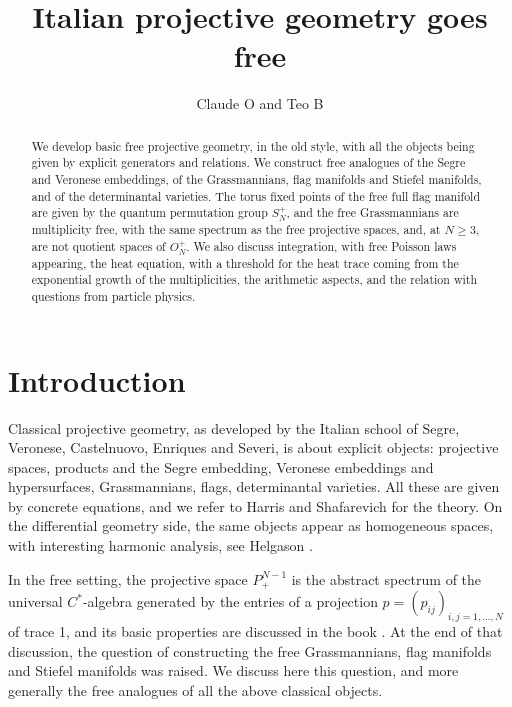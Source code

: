 \documentclass[11pt]{article}
\title{Italian projective geometry goes free}
\author{Claude O and Teo B}
\date{}
\theoremstyle{plain}
\begin{document}
\maketitle

\begin{abstract}
We develop basic free projective geometry, in the old style, with all the objects being given by explicit generators and relations. We construct free analogues of the Segre and Veronese embeddings, of the Grassmannians, flag manifolds and Stiefel manifolds, and of the determinantal varieties. The torus fixed points of the free full flag manifold are given by the quantum permutation group $S_N^+$, and the free Grassmannians are multiplicity free, with the same spectrum as the free projective spaces, and, at $N\geq3$, are not quotient spaces of $O_N^+$. We also discuss integration, with free Poisson laws appearing, the heat equation, with a threshold for the heat trace coming from the exponential growth of the multiplicities, the arithmetic aspects, and the relation with questions from particle physics.
\end{abstract}

\tableofcontents

\section*{Introduction}

Classical projective geometry, as developed by the Italian school of Segre, Veronese, Castelnuovo, Enriques and Severi, is about explicit objects: projective spaces, products and the Segre embedding, Veronese embeddings and hypersurfaces, Grassmannians, flags, determinantal varieties. All these are given by concrete equations, and we refer to Harris \cite{har} and Shafarevich \cite{sha} for the theory. On the differential geometry side, the same objects appear as homogeneous spaces, with interesting harmonic analysis, see Helgason \cite{hel}.

\bigskip

In the free setting, the projective space $P^{N-1}_+$ is the abstract spectrum of the universal $C^*$-algebra generated by the entries of a projection $p=(p_{ij})_{i,j=1,\ldots,N}$ of trace 1, and its basic properties are discussed in the book \cite{ba1}. At the end of that discussion, the question of constructing the free Grassmannians, flag manifolds and Stiefel manifolds was raised. We discuss here this question, and more generally the free analogues of all the above classical objects.
\end{document}
